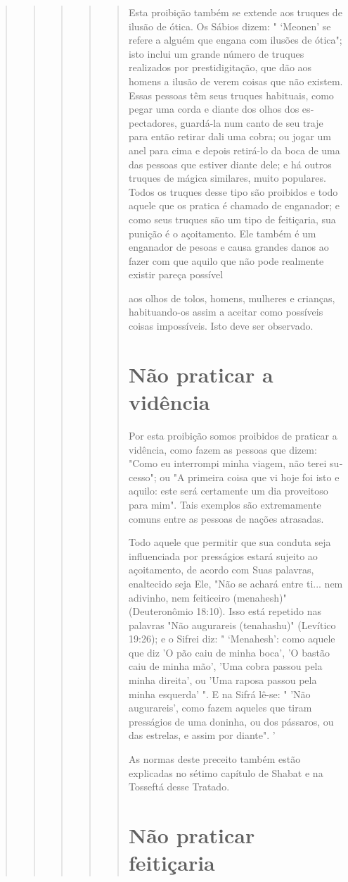 \begin{quote}
\begin{quote}
\begin{quote}
\begin{quote}
\begin{quote}
Esta proibição também se extende aos truques de ilusão de ótica. Os
Sábios dizem: " `Meonen' se refere a alguém que engana com ilusões de
óti­ca"; isto inclui um grande número de truques realizados por
prestidigitação, que dão aos homens a ilusão de verem coisas que não
existem. Essas pessoas têm seus truques habituais, como pegar uma corda
e diante dos olhos dos es­pectadores, guardá-la num canto de seu traje
para então retirar dali uma cobra; ou jogar um anel para cima e depois
retirá-lo da boca de uma das pessoas que estiver diante dele; e há
outros truques de mágica similares, muito populares. Todos os truques
desse tipo são proibidos e todo aquele que os pratica é cha­mado de
enganador; e como seus truques são um tipo de feitiçaria, sua punição é
o açoitamento. Ele também é um enganador de pesoas e causa grandes
da­nos ao fazer com que aquilo que não pode realmente existir pareça
possível


aos olhos de tolos, homens, mulheres e crianças, habituando-os assim a
aceitar como possíveis coisas impossíveis. Isto deve ser observado.

\section{Não praticar a vidência}

Por esta proibição somos proibidos de praticar a vidência, como fa­zem
as pessoas que dizem: "Como eu interrompi minha viagem, não terei
su­cesso"; ou "A primeira coisa que vi hoje foi isto e aquilo: este será
certamente um dia proveitoso para mim". Tais exemplos são extremamente
comuns entre as pessoas de nações atrasadas.

Todo aquele que permitir que sua conduta seja influenciada por
pres­ságios estará sujeito ao açoitamento, de acordo com Suas palavras,
enaltecido seja Ele, "Não se achará entre ti... nem adivinho, nem
feiticeiro (menahesh)" (Deuteronômio 18:10). Isso está repetido nas
palavras "Não augurareis (tena­hashu)" (Levítico 19:26); e o Sifrei diz:
" `Menahesh': como aquele que diz 'O pão caiu de minha boca', 'O bastão
caiu de minha mão', 'Uma cobra passou pela minha direita', ou 'Uma
raposa passou pela minha esquerda' ". E na Sifrá lê-se: " 'Não
augurareis', como fazem aqueles que tiram presságios de uma do­ninha, ou
dos pássaros, ou das estrelas, e assim por diante". '

As normas deste preceito também estão explicadas no sétimo capí­tulo de
Shabat e na Tosseftá desse Tratado.

\section{Não praticar feitiçaria}


\end{quote}
\end{quote}
\end{quote}
\end{quote}
\end{quote}
